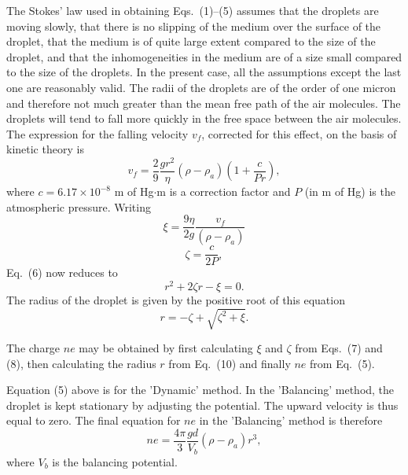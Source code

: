 \documentclass[%
sor,
 jor,
 amsmath,amssymb,
 reprint,%
]{revtex4-2}
\begin{document}
The Stokes' law used in obtaining Eqs.~(1)--(5) assumes that the droplets are moving slowly, that there is no slipping of the medium over the surface of the droplet, that the medium is of quite large extent compared to the size of the droplet, and that the inhomogeneities in the medium are of a size small compared to the size of the droplets. In the present case, all the assumptions except the last one are reasonably valid. The radii of the droplets are of the order of one micron and therefore not much greater than the mean free path of the air molecules. The droplets will tend to fall more quickly in the free space between the air molecules. The expression for the falling velocity $v_f$, corrected for this effect, on the basis of kinetic theory is
\begin{equation}
    v_f = \frac{2}{9} \frac{g r^2}{\eta} (\rho - \rho_a) \left( 1 + \frac{c}{P r} \right),
\end{equation}
where $c = 6.17 \times 10^{-8}$ m of Hg$\cdot$m is a correction factor and $P$ (in m of Hg) is the atmospheric pressure. Writing
\begin{equation}
    \xi = \frac{9 \eta}{2 g} \frac{v_f}{(\rho - \rho_a)}
\end{equation}
\begin{equation}
    \zeta = \frac{c}{2 P},
\end{equation}
Eq.~(6) now reduces to
\begin{equation}
    r^2 + 2 \zeta r - \xi = 0.
\end{equation}
The radius of the droplet is given by the positive root of this equation
\begin{equation}
    r = -\zeta + \sqrt{\zeta^2 + \xi}.
\end{equation}

The charge $ne$ may be obtained by first calculating $\xi$ and $\zeta$ from Eqs.~(7) and (8), then calculating the radius $r$ from Eq.~(10) and finally $ne$ from Eq.~(5).

Equation (5) above is for the 'Dynamic' method. In the 'Balancing' method, the droplet is kept stationary by adjusting the potential. The upward velocity is thus equal to zero. The final equation for $ne$ in the 'Balancing' method is therefore
\begin{equation}
    ne = \frac{4 \pi}{3} \frac{g d}{V_b} (\rho - \rho_a) r^3,
\end{equation}
where $V_b$ is the balancing potential.
\end{document}
